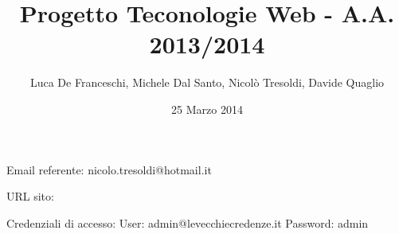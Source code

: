 \documentclass[a4paper]{article}
\title{Progetto Teconologie Web - A.A. 2013/2014}
\author{Luca De Franceschi, Michele Dal Santo, Nicolò Tresoldi, Davide Quaglio}
\date{25 Marzo 2014}
\begin{document}
\maketitle

Email referente: nicolo.tresoldi@hotmail.it

URL sito: %

Credenziali di accesso:
User:  admin@levecchiecredenze.it
Password: admin











%
\end{document}
